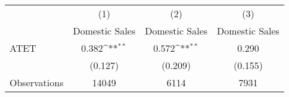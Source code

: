 {
\def\sym#1{\ifmmode^{#1}\else\(^{#1}\)\fi}
\begin{tabular}{l*{3}{c}}
\hline\hline
                    &\multicolumn{1}{c}{(1)}&\multicolumn{1}{c}{(2)}&\multicolumn{1}{c}{(3)}\\
                    &\multicolumn{1}{c}{Domestic Sales}&\multicolumn{1}{c}{Domestic Sales}&\multicolumn{1}{c}{Domestic Sales}\\
\hline
ATET                &       0.382\sym{**} &       0.572\sym{**} &       0.290         \\
                    &     (0.127)         &     (0.209)         &     (0.155)         \\
\hline
Observations        &       14049         &        6114         &        7931         \\
\hline\hline
\end{tabular}
}
